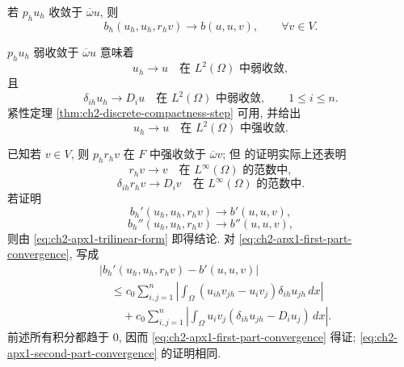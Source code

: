 \begin{Lemma}
\label{lem:ch2-apx1-trilinear-convergence}
若 $p_hu_h$ 收敛于 $\overline\omega u$, 则
\begin{equation}
b_h(u_h,u_h,r_hv)\longrightarrow b(u,u,v),
\qquad\forall v\in V.
\label{eq:ch2-apx1-trilinear-convergence}
\end{equation}
\end{Lemma}

\begin{Proof}
$p_hu_h$ 弱收敛于 $\overline\omega u$ 意味着
\begin{equation}
u_h\longrightarrow u\quad\text{在 }L^2(\Omega)\text{ 中弱收敛},
\label{eq:ch2-apx1-weak-l2}
\end{equation}
且
\begin{equation}
\delta_{ih}u_h\longrightarrow D_iu
\quad\text{在 }L^2(\Omega)\text{ 中弱收敛},
\qquad1\leq i\leq n.
\label{eq:ch2-apx1-weak-derivatives}
\end{equation}
紧性定理 \ref{thm:ch2-discrete-compactness-step} 可用, 并给出
\begin{equation}
u_h\longrightarrow u\quad\text{在 }L^2(\Omega)\text{ 中强收敛}.
\label{eq:ch2-apx1-strong-l2}
\end{equation}

\hypertarget{chapter-02-page-154}{}
已知若 $v\in V$, 则 $p_hr_hv$ 在 $F$ 中强收敛于 $\overline\omega v$; 但  的证明实际上还表明
\begin{equation}
r_hv\longrightarrow v\quad\text{在 }L^\infty(\Omega)\text{ 的范数中},
\label{eq:ch2-apx1-lift-uniform}
\end{equation}
\begin{equation}
\delta_{ih}r_hv\longrightarrow D_iv
\quad\text{在 }L^\infty(\Omega)\text{ 的范数中}.
\label{eq:ch2-apx1-lift-derivative-uniform}
\end{equation}
若证明
\begin{equation}
b_h'(u_h,u_h,r_hv)\longrightarrow b'(u,u,v),
\label{eq:ch2-apx1-first-part-convergence}
\end{equation}
\begin{equation}
b_h''(u_h,u_h,r_hv)\longrightarrow b''(u,u,v),
\label{eq:ch2-apx1-second-part-convergence}
\end{equation}
则由 \eqref{eq:ch2-apx1-trilinear-form} 即得结论. 对 \eqref{eq:ch2-apx1-first-part-convergence}, 写成
\[
\begin{aligned}
&|b_h'(u_h,u_h,r_hv)-b'(u,u,v)|\\
&\quad\leq c_0\sum_{i,j=1}^{n}
\left|\int_\Omega(u_{ih}v_{jh}-u_iv_j)\delta_{ih}u_{jh}\,dx\right|\\
&\qquad+c_0\sum_{i,j=1}^{n}
\left|\int_\Omega u_iv_j(\delta_{ih}u_{jh}-D_iu_j)\,dx\right|.
\end{aligned}
\]
前述所有积分都趋于 $0$, 因而 \eqref{eq:ch2-apx1-first-part-convergence} 得证; \eqref{eq:ch2-apx1-second-part-convergence} 的证明相同.
\end{Proof}

